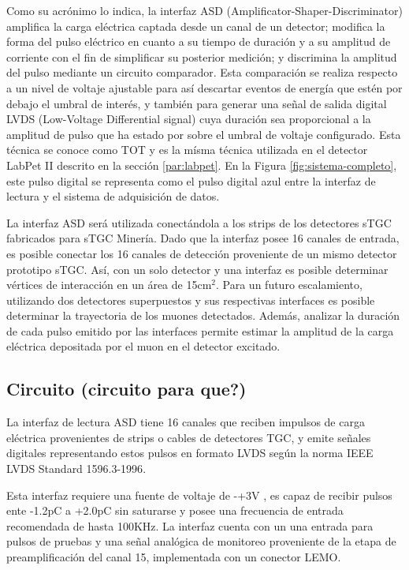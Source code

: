 Como su acrónimo lo indica, la interfaz ASD (Amplificator-Shaper-Discriminator)  amplifica la carga eléctrica captada desde un canal de un detector;  modifica la forma del pulso eléctrico en cuanto a su tiempo de duración y a su amplitud de corriente con el fin de simplificar su posterior medición; y discrimina la amplitud del pulso mediante un circuito comparador. Esta comparación se realiza respecto a un nivel de voltaje ajustable para así descartar eventos de energía que estén por debajo el umbral de interés, y también para generar una señal de salida digital LVDS (Low-Voltage Differential signal) cuya duración sea proporcional a la amplitud de pulso que ha estado por sobre el umbral de voltaje configurado. Esta técnica se conoce como TOT  y es la mísma técnica utilizada en el detector LabPet II descrito en la sección \ref{par:labpet}.  En la Figura \ref{fig:sistema-completo}, este pulso digital se representa como el pulso digital azul entre la interfaz de lectura y el sistema de adquisición de datos.
        
La interfaz ASD será utilizada conectándola a los strips de los detectores sTGC fabricados para sTGC Minería. Dado que la interfaz posee 16 canales de entrada, es posible conectar los 16 canales de detección proveniente de un mismo detector prototipo sTGC. Así, con un solo detector y una interfaz es posible determinar vértices de interacción en un área de 15cm$^2$. Para un futuro escalamiento, utilizando dos detectores superpuestos y sus respectivas interfaces es posible determinar la trayectoria de los muones detectados. Además, analizar la duración de cada pulso emitido por las interfaces permite estimar la amplitud de la carga eléctrica depositada por el muon en el detector excitado.


\subsection{Circuito (circuito para que?)}
La interfaz de lectura ASD tiene 16 canales que reciben impulsos de carga eléctrica provenientes de strips o cables de detectores TGC, y emite señales digitales representando estos pulsos en formato LVDS según la norma IEEE LVDS Standard 1596.3-1996\cite{1996IEEESociety}.

Esta interfaz requiere una fuente de voltaje de -+3V\cite{1999ATLASICs} , es capaz de recibir pulsos ente -1.2pC a +2.0pC sin saturarse y posee una frecuencia de entrada recomendada  de hasta 100KHz. La interfaz cuenta con un una entrada para pulsos de pruebas y una señal analógica de monitoreo proveniente de la etapa de preamplificación del canal 15, implementada con un conector LEMO.

